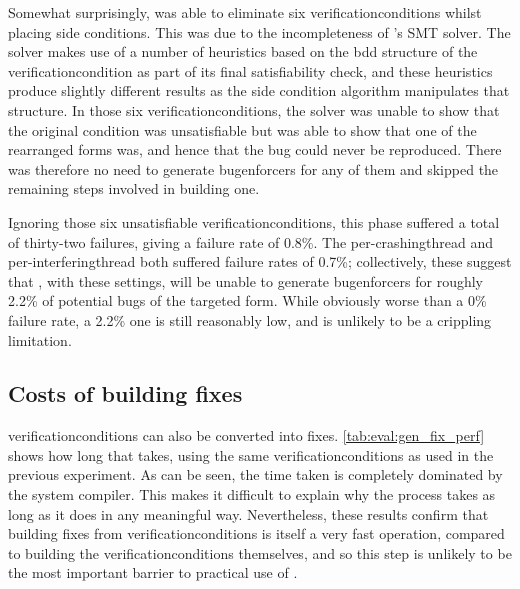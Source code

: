 Somewhat surprisingly, {\implementation} was able to eliminate six
\glspl{verificationcondition} whilst placing side conditions.  This
was due to the incompleteness of {\implementation}'s SMT solver.  The
solver makes use of a number of heuristics based on the \gls{bdd}
structure of the \gls{verificationcondition} as part of its final
satisfiability check, and these heuristics produce slightly different
results as the side condition algorithm manipulates that structure.
In those six \glspl{verificationcondition}, the solver was unable to
show that the original condition was unsatisfiable but was able to
show that one of the rearranged forms was, and hence that the bug
could never be reproduced.  There was therefore no need to generate
\glspl{bugenforcer} for any of them and {\implementation} skipped the
remaining steps involved in building one.

Ignoring those six unsatisfiable \glspl{verificationcondition}, this
phase suffered a total of thirty-two failures, giving a failure rate
of 0.8\%.  The per-\gls{crashingthread} and
per-\gls{interferingthread} both suffered failure rates of 0.7\%;
collectively, these suggest that {\implementation}, with these settings,
will be unable to generate \glspl{bugenforcer} for roughly 2.2\% of
potential bugs of the targeted form.  While obviously worse than a 0\%
failure rate, a 2.2\% one is still reasonably low, and is unlikely to
be a crippling limitation.

\subsection{Costs of building fixes}

\Glspl{verificationcondition} can also be converted into fixes.
\autoref{tab:eval:gen_fix_perf} shows how long that takes, using the
same \glspl{verificationcondition} as used in the previous experiment.
As can be seen, the time taken is completely dominated by the system
compiler.  This makes it difficult to explain why the process takes as
long as it does in any meaningful way.  Nevertheless, these results
confirm that building fixes from \glspl{verificationcondition} is
itself a very fast operation, compared to building the
\glspl{verificationcondition} themselves, and so this step is unlikely
to be the most important barrier to practical use of {\technique}.

